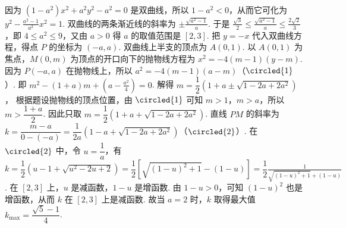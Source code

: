 \documentclass[UTF8,a4paper,oneside,11pt]{ctexbook}
\begin{document}
\begin{solution}
因为 \((1 - a^2)x^2 + a^2y^2 - a^2 = 0\) 是双曲线，所以 \(1-a^2<0\)，从而它可化为 \(y^2-\frac{a^2-1}{a^2}x^2=1\).
双曲线的两条渐近线的斜率为 \(\pm \frac{\sqrt{a^2 - 1}}{a}\). 于是 \(\frac{\sqrt{3}}{2} \leqslant \frac{\sqrt{a^2 - 1}}{a} \leqslant \frac{2\sqrt{2}}{3}\)，即 \(4 \leqslant a^2 \leqslant 9\)，又由 \(a > 0\) 得 \(a\) 的取值范围是 \([2,3]\).
把 \(y = -x\) 代入双曲线方程，得点 \(P\) 的坐标为 \((-a,a)\).
双曲线上半支的顶点为 \(A(0,1)\).
以 \(A(0,1)\) 为焦点，\(M(0,m)\) 为顶点的开口向下的抛物线方程为 \(x^2 = -4(m - 1)(y - m)\).
因为 \(P(-a,a)\) 在抛物线上，所以 \(a^2 = -4(m - 1)(a - m)\)（\(\circled{1}\)）.
即 \(m^2 - (1 + a)m + \left(a - \frac{a^2}{4}\right) = 0\). 解得 \(m = \dfrac{1}{2}\left(1 + a \pm \sqrt{1 - 2a + 2a^2}\right)\)，
根据题设抛物线的顶点位置，由 \(\circled{1}\) 可知 \(m > 1\)，\(m > a\)，所以 \(m > \dfrac{1 + a}{2}\).
因此只取 \(m = \dfrac{1}{2}\left(1 + a + \sqrt{1 - 2a + 2a^2}\right)\).
直线 \(PM\) 的斜率为 \(k = \dfrac{m - a}{0 - (-a)} = \dfrac{1}{2a}\left(1 - a + \sqrt{1 - 2a + 2a^2}\right)\)（\(\circled{2}\)）.
在 \(\circled{2}\) 中，令 \(u = \dfrac{1}{a}\)，有 \(k = \dfrac{1}{2}\left(u - 1 + \sqrt{u^2 - 2u + 2}\right) = \dfrac{1}{2}\left[\sqrt{(1 - u)^2 + 1} - (1 - u)\right] = \dfrac{1}{2}\frac{1}{\sqrt{(1 - u)^2 + 1} + (1 - u)}\).
在 \([2,3]\) 上，\(u\) 是减函数，\(1 - u\) 是增函数. 由 \(1 - u > 0\)，可知 \((1 - u)^2\) 也是增函数，从而 \(k\) 在 \([2,3]\) 上是减函数. 故当 \(a = 2\) 时，\(k\) 取得最大值 \(k_{\max} = \dfrac{\sqrt{5} - 1}{4}\).

\end{solution}

\end{document}
